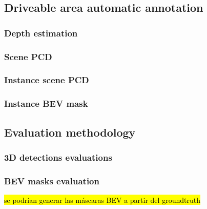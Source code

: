 \subsection{ Driveable area automatic annotation}
\label{aplicacion}

\subsubsection{Depth estimation}
\subsubsection{Scene PCD}
\subsubsection{Instance scene PCD}
\subsubsection{Instance BEV mask}

\subsection{Evaluation methodology}
\label{evaluacion}

\subsubsection{3D detections evaluations}
\subsubsection{BEV masks evaluation}
\hl{se podrían generar las máscaras BEV a partir del groundtruth}


